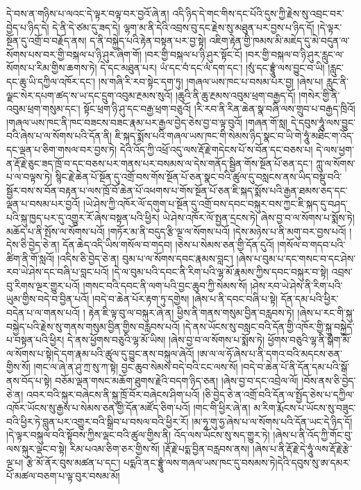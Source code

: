 དེ་བས་ན་གཉིས་པ་ལའང་དེ་ལྟར་བལྟ་བར་བྱའོ་ཞེ་ན། འདི་ཉིད་དེ་གང་གིས་དང་པོའི་དུས་ཀྱི་རྗེས་སུ་འབྲང་བར་བྱེད་པ་ཉིད་དེ། དེ་ནི་དེ་ཙམ་དུ་ཟད་དེ། ལྷག་མ་ནི་དེའི་འབྲས་བུ་དང་རྗེས་སུ་མཐུན་པར་བྱས་པ་ཉིད་དོ། །དེ་ལྟར་སྔོན་དུ་འགྲོ་བ་བརྗོད་ནས། ད་ནི་བསྐྱེད་པའི་རྟེན་བསྟན་པར་བྱ་སྟེ། འཇིག་རྟེན་གྱི་ཁམས་མི་མཇེད་དུ་མེ་བདུན་ལ་སོགས་པས་བར་གྱི་བསྐལ་པ་ཉི་ཤུར་ཞིག་གོ། །བར་གྱི་བསྐལ་པ་ཉི་ཤུར་སྟོང་ངོ། །བར་གྱི་བསྐལ་བ་ཉི་ཤུར་རླུང་ལ་སོགས་པ་རིམ་གྱིས་ཆགས་ཏེ། དེ་དང་མཐུན་པར། ཡཾ་དང་བཾ་དང་ལཾ་དག་དང་། །སུཾ་དང་བྷྲཱུཾ་ལས་བྱུང་བ་ཡི། །རླུང་དང་ཆུ་ཡི་དཀྱིལ་འཁོར་དང་། །ས་གཞི་རི་རབ་སྟེང་དག་ཏུ། །གཞལ་ཡས་ཁང་པ་བསམ་པར་བྱ། །ཞེས་པ། རླུང་ནི་​ ལྗང་སེར་དཔག་ཚད་ས་ཡ་དང་དྲུག་འབུམ་རྔམས་སུའོ། །ཆུའི་ནི་ཆུ་རྔམས་འབུམ་ཕྲག་བརྒྱད་དོ། །གསེར་གྱི་ནི་འབུམ་ཕྲག་གསུམ་དང་། སྟོང་ཕྲག་ཉི་ཤུ་དང་བརྒྱ་ཕྲག་བཅུའོ། །རི་རབ་ནི་རིན་ཆེན་སྣ་བཞི་ལས་གྲུབ་པ་བརྒྱད་ཁྲིའོ། །གཞལ་ཡས་ཁང་ནི་ཁང་{བཟངས་བཟང་}རྣམ་པར་རྒྱལ་བྱེད་ཅེས་བྱ་བ་ལྟ་བུའོ། །གཞན་གོ་སླ། དེ་དབུས་ཧཱུཾ་ལས་བྱུང་བའི་ཞེས་པ་ལ་སོགས་པའི་དོན་ནི། ཇི་སྐད་སྨོས་པའི་གཞལ་ཡས་ཁང་གི་སེམས་ཉིད་སྣང་བ་ཡི་གེ་ཧཱུཾ་མཐིང་ག་འོད་དང་ལྡན་པ་ཅིག་གསལ་བར་བྱས་ཏེ། དེའི་འོད་ཀྱི་འཕྲོ་འདུ་ལས་རྡོ་རྗེ་གདེངས་པོ་ས་བོན་དང་བཅས་པ། དེ་ལས་ཕྱག་ན་རྡོ་རྗེ་ཅུང་ཟད་ཁྲོ་བ་དང་བཅས་པར་གནས་པར་བསམས་ལ་དེས་གནོད་སྦྱིན་གོས་སྔོན་པོ་ཅན་དང་། ཀླུ་ལ་སོགས་པ་ལ་བལྟས་ཏེ། སྙིང་རྗེ་ཆེན་པོ་སྔོན་དུ་འགྲོ་བས་གོས་སྔོན་པོ་ཅན་སྣང་བའི་ཚུལ་དུ་བསླངས་ནས་ཡིད་བསྡུ་བའི་སྦྱོར་བས་ས་བོན་བརྟན་པ་ལས་ཁྲོ་བོ་ཆེན་པོ་འཕགས་པ་གོས་སྔོན་པོ་ཅན་ཇི་སྐད་སྨོས་པའི་རྒྱན་ཐམས་ཅད་དང་ལྡན་པ་བསམ་པར་བྱའོ། །ཡེ་ཤེས་ཀྱི་འཁོར་ལོ་དགུག་པ་སྔོན་དུ་འགྲོ་བས་དབང་བསྐུར་བས་ཀྱང་ཇི་སྐད་དུ་བཤད་པའི་སྐུ་ཁྱད་པར་དུ་འགྱུར་རོ་ཞེས་བསྟན་པའི་ཕྱིར། ཡེ་ཤེས་འཁོར་ལོ་སྤྱན་དྲངས་ཏེ། ཞེས་བྱ་བ་ལ་སོགས་པ་སྨོས་ཏེ། མཆོད་པ་ནི་སྤོས་ལ་སོགས་པའོ། །གཏོར་མ་ནི་བདུད་རྩི་ལྔ་ལ་སོགས་པའོ། །དེས་མཉེས་པ་ནི་མགུ་བར་བྱས་པའོ། །དེས་ཅི་བྱེད་ཅེ་ན། དོན་ཆེད་འདི་ཡིས་གསོལ་བ་གདབ། །ཅེས་པ་སེམས་ཅན་གྱི་དོན་དུའོ། །གསོལ་བ་གདབ་པའི་ཚིག་ནི་གོ་སླའོ། །འདིས་ཅི་བྱེད་ཅེ་ན། བུམ་པ་ལ་སོགས་དབང་རྣམས་བླང་། །ཞེས་པ་བུམ་པ་དང་གསང་བ་དང་ཤེས་རབ་ཡེ་ཤེས་དང་བཞི་པ་བླང་པའོ། །དེ་ལ་བུམ་པའི་དབང་ནི་རིག་པའི་ལྷ་མོ་རྣམས་ཀྱིས་དབང་བསྐུར་བ་སྟེ། འབྲས་བུ་རིགས་ལྔར་གྱུར་པའོ། །གསང་བའི་དབང་ནི་ལག་པའི་བྱང་ཆུབ་ཀྱི་སེམས་སོ། །ཤེས་རབ་ཡེ་ཤེས་ནི་རིག་པའི་ཡུམ་གྱིས་བདེ་བ་བྱིན་པའོ། །བདེ་བ་ཆེན་པོར་རྟག་ཏུ་དགྱེས། །ཞེས་པ་ནི་དབང་བཞི་པ་སྟེ། དོན་དམ་པའི་ཕྱིར་བདེན་པ་ལ་གནས་པའོ། །  ​ རྟེན་ཇི་ལྟ་བུ་ལ་བསྐུར་ཞེ་ན། ཕྱིས་ནི་གནས་གསུམ་བྱིན་བརླབས་ཏེ། །ཞེས་པ་རང་གི་སྐུ་བསྐྱེད་པའི་རྗེས་སུ་གནས་གསུམ་བྱིན་གྱིས་བརླབས་པའོ། །དེ་ནས་ཡོངས་སུ་བསླང་བའི་དོན་གྱི་འཁོར་གྱི་སྐུ་བསྐྱེད་པ་བསྟན་པའི་ཕྱིར། དེ་ནས་ཕྱོགས་བཅུའི་ལྷ་མོ་ཡིས། །ཞེས་བྱ་བ་ལ་སོགས་པ་སྨོས་ཏེ། ཕྱོགས་བཅུའི་ལྷ་ནི་སྒེག་མོ་ལ་སོགས་པ་སྟེ།དེ་དག་རྣམ་པའི་ཚུལ་དུ་བྱུང་ནས་བསྐུལ་ཞེའོ། །ཨ་ལ་ལ་ཧོ་ཞེས་པ་ནི་དགའ་བའི་མདངས་ཅན་གྱིས་སོ། །གང་ལ་ཞེ་ན་ཤུ་ཀྲ་སུ་ཀ་སྟེ། བྱང་ཆུབ་སེམས་བདེ་བའི་ངང་ལས་སོ། །བདེ་བ་ཆེན་པོ་ནི་དོན་དམ་པའི་སྒོ་ནས་བོད་པ་སྟེ། བཅོམ་ལྡན་གསང་མཆོག་ཐུགས་རྗེའི་བདག་ཉིད་ཅན། །ཞེས་བྱ་བ་དང་འབྲེལ་ལོ། །བོས་ནས་ཅི་བྱེད་ཅེ་ན། འབར་བའི་སྐུར་བཞེངས་ནི་སྐུ་ཁྲོ་བོར་བཞེངས་ཤིག་པའོ། །ཅི་བྱེད་ཅེ་ན་འགྲོ་བའི་དོན་ལ་སྤྱོད་ཅེས་པ་དཀྱིལ་འཁོར་ཡོངས་སུ་རྒྱས་པ་སེམས་ཅན་གྱི་དོན་མཛོད་ཅིག་པའོ། །གང་གི་ཕྱིར་ཞེ་ན། མ་རིག་རྨོངས་པ་ཡོངས་སུ་བཟུང་བའི་ཕྱིར་ཏེ་བླུན་པར་འགྱུར་བའི་སྒྲིབ་པ་བསལ་བའི་ཕྱིར་རོ། །མ་ཧཱ་གུ་ཧྱ་ཞེས་པ་ལ་སོགས་པའི་དོན་ཡང་དེ་ཉིད་དོ། །དེ་ལྟར་བསྐུལ་བའི་སྟོབས་ཀྱིས་ལྡང་བའི་ཚུལ་གྱིས་ནི། འོད་ལས་ཡོངས་སུ་སད་གྱུར་ཏེ། །ཞེས་པ་ནི་འོད་ཀྱི་གོང་བུ་ལས་སྐུར་ལྡང་བ་སྟེ། རིམ་པའམ་ཅིག་ཅར་གྱིས་སོ། །རྡོ་རྗེ་པདྨ་བྱིན་བརླབས་ནས། །ཞེས་པ་ནི་རྡོ་རྗེ་དེ་ཧཱུཾ་ལས་རྡོ་རྗེ་རྩེ་ལྔ་པ། རྩེ་མོ་ནོར་བུས་མཚན་པ་དང་། པདྨའི་ནང་བྷྲཱུཾ་ལས་གཞལ་ཡས་ཁང་དུ་བསམས་ཏེ།དེའི་དབུས་སུ་ཨ་དམར་པོ་མཚལ་བཅག་པ་ལྟ་བུར་བསམ་མོ། 